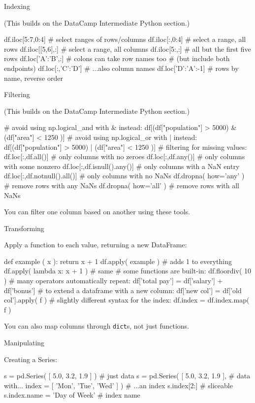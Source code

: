 \documentclass[a4paper,landscape,columns=3]{cheatsheet}
\def\sect#1{\begin{tcolorbox}[colback=blue!5!white,colframe=blue!75!black,size=title,leftrule=2mm]
    \large #1
\end{tcolorbox}}
\begin{document}
\sect{Indexing}

(This builds on the DataCamp Intermediate Python section.)
\begin{python}
df.iloc[5:7,0:4]     # select ranges of rows/columns
df.iloc[:,0:4]       # select a range, all rows
df.iloc[[5,6],:]     # select a range, all columns
df.iloc[5:,:]        # all but the first five rows
df.loc['A':'B',:]    # colons can take row names too
                     # (but include both endpoints)
df.loc[:,'C':'D']    # ...also column names
df.loc['D':'A':-1]   # rows by name, reverse order
\end{python}

\sect{Filtering}

(This builds on the DataCamp Intermediate Python section.)
\begin{python}
# avoid using np.logical_and with & instead:
df[(df["population"] > 5000)
 & (df["area"] < 1250 )]
# avoid using np.logical_or with | instead:
df[(df["population"] > 5000)
 | (df["area"] < 1250 )]
# filtering for missing values:
df.loc[:,df.all()]  # only columns with no zeroes
df.loc[:,df.any()]  # only columns with some nonzero
df.loc[:,df.isnull().any()]
                    # only columns with a NaN entry
df.loc[:,df.notnull().all()]
                    # only columns with no NaNs
df.dropna( how='any' )
                    # remove rows with any NaNs
df.dropna( how='all' )
                    # remove rows with all NaNs
\end{python}

You can filter one column based on another using these tools.

\sect{Transforming}

Apply a function to each value, returning a new DataFrame:
\begin{python}
def example ( x ):
    return x + 1
df.apply( example )   # adds 1 to everything
df.apply( lambda x: x + 1 )    # same
# some functions are built-in:
df.floordiv( 10 )
# many operators automatically repeat:
df['total pay'] = df['salary'] + df['bonus']
# to extend a dataframe with a new column:
df['new col'] = df['old col'].apply( f )
# slightly different syntax for the index:
df.index = df.index.map( f )
\end{python}

You can also map columns through \lstinline{dict}s, not just functions.

\sect{Manipulating}

Creating a Series:
\begin{python}
s = pd.Series( [ 5.0, 3.2, 1.9 ] )   # just data
s = pd.Series( [ 5.0, 3.2, 1.9 ],    # data with...
  index = [ 'Mon', 'Tue', 'Wed' ] )  # ...an index
s.index[2:]                          # sliceable
s.index.name = 'Day of Week'         # index name
\end{python}
\end{document}
